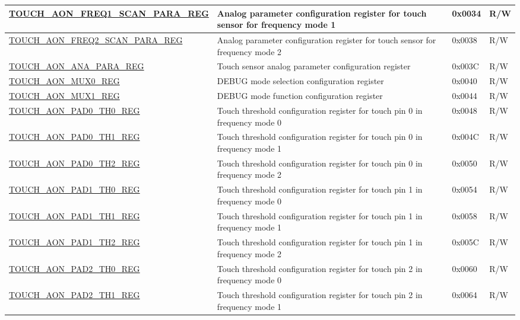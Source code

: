 \begin{longtable}{ | p{8cm} | p{12.5cm} | p{1.3cm} | p{1cm} | }
\hyperref[regdesc:TOUCHAONFREQ1SCANPARAREG]{TOUCH\_AON\_FREQ1\_SCAN\_PARA\_REG} & Analog parameter configuration register for touch sensor for frequency mode 1 & 0x0034 & R/W \\ \hline
\hyperref[regdesc:TOUCHAONFREQ2SCANPARAREG]{TOUCH\_AON\_FREQ2\_SCAN\_PARA\_REG} & Analog parameter configuration register for touch sensor for frequency mode 2 & 0x0038 & R/W \\ \hline
\hyperref[regdesc:TOUCHAONANAPARAREG]{TOUCH\_AON\_ANA\_PARA\_REG} & Touch sensor analog parameter configuration register & 0x003C & R/W \\ \hline
\hyperref[regdesc:TOUCHAONMUX0REG]{TOUCH\_AON\_MUX0\_REG} & DEBUG mode selection configuration register & 0x0040 & R/W \\ \hline
\hyperref[regdesc:TOUCHAONMUX1REG]{TOUCH\_AON\_MUX1\_REG} & DEBUG mode function configuration register & 0x0044 & R/W \\ \hline
\hyperref[regdesc:TOUCHAONPADNTH0REG]{TOUCH\_AON\_PAD0\_TH0\_REG} & Touch threshold configuration register for touch pin 0 in frequency mode 0  & 0x0048 & R/W \\ \hline
\hyperref[regdesc:TOUCHAONPADNTH1REG]{TOUCH\_AON\_PAD0\_TH1\_REG} & Touch threshold configuration register for touch pin 0 in frequency mode 1  & 0x004C & R/W \\ \hline
\hyperref[regdesc:TOUCHAONPADNTH2REG]{TOUCH\_AON\_PAD0\_TH2\_REG} & Touch threshold configuration register for touch pin 0 in frequency mode 2  & 0x0050 & R/W \\ \hline
\hyperref[regdesc:TOUCHAONPADNTH0REG]{TOUCH\_AON\_PAD1\_TH0\_REG} & Touch threshold configuration register for touch pin 1 in frequency mode 0  & 0x0054 & R/W \\ \hline
\hyperref[regdesc:TOUCHAONPADNTH1REG]{TOUCH\_AON\_PAD1\_TH1\_REG} & Touch threshold configuration register for touch pin 1 in frequency mode 1  & 0x0058 & R/W \\ \hline
\hyperref[regdesc:TOUCHAONPADNTH2REG]{TOUCH\_AON\_PAD1\_TH2\_REG} & Touch threshold configuration register for touch pin 1 in frequency mode 2  & 0x005C & R/W \\ \hline
\hyperref[regdesc:TOUCHAONPADNTH0REG]{TOUCH\_AON\_PAD2\_TH0\_REG} & Touch threshold configuration register for touch pin 2 in frequency mode 0 & 0x0060 & R/W \\ \hline
\hyperref[regdesc:TOUCHAONPADNTH1REG]{TOUCH\_AON\_PAD2\_TH1\_REG} & Touch threshold configuration register for touch pin 2 in frequency mode 1  & 0x0064 & R/W \\ \hline

\end{longtable}
